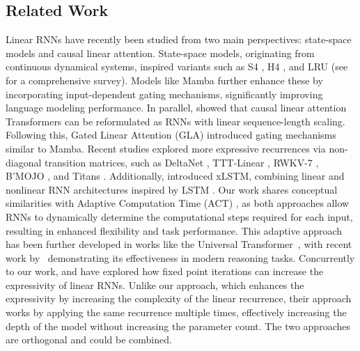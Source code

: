 \documentclass{article} %
\begin{document}
\subsection{Related Work}\label{sec:related_work}
\vspace{-2mm}
Linear RNNs have recently been studied from two main perspectives: state-space models and causal linear attention. State-space models, originating from continuous dynamical systems, inspired variants such as S4 \citep{gu-iclr22a}, H4 \citep{fu-iclr23a}, and LRU \citep{orvieto-icml23a} (see \citet{tiezzi2024statespacemodelinglongsequence} for a comprehensive survey). Models like Mamba \citep{gu2023mamba, dao-icml24a} further enhance these by incorporating input-dependent gating mechanisms, significantly improving language modeling performance.
In parallel, \citet{katharopoulos-icml20a} showed that causal linear attention Transformers can be reformulated as RNNs with linear sequence-length scaling. Following this, Gated Linear Attention (GLA) \citep{yang-icml24a} introduced gating mechanisms similar to Mamba. Recent studies explored more expressive recurrences via non-diagonal transition matrices, such as DeltaNet \citep{schlag-icml21a,irie2023practical,yang-neurips24a}, TTT-Linear \citep{sun-arxiv24a}, RWKV-7 \citep{peng2025rwkv7gooseexpressivedynamic}, B'MOJO \citep{zancato-neurips24a}, and Titans \citep{behrouz2024titans}. Additionally, \citet{beck-neurips24a} introduced xLSTM, combining linear and nonlinear RNN architectures inspired by LSTM \citep{hochreiter1997long}.
Our work shares conceptual similarities with Adaptive Computation Time (ACT) \citep{graves2016adaptive}, as both approaches allow RNNs to dynamically determine the computational steps required for each input, resulting in enhanced flexibility and task performance. 
This adaptive approach has been further developed in works like the Universal Transformer~\citep{dehghani-iclr19a}, with recent work by~\citet{geiping2025scaling} demonstrating its effectiveness in modern reasoning tasks. Concurrently to our work, \citet{schone2025implicit} and \citet{movahedi2025fixedpoint} have explored how fixed point iterations can increase the expressivity of linear RNNs. Unlike our approach, which enhances the expressivity by increasing the complexity of the linear recurrence, their approach works by applying the same recurrence multiple times, effectively increasing the depth of the model without increasing the parameter count. The two approaches are orthogonal and could be combined.
\end{document}
